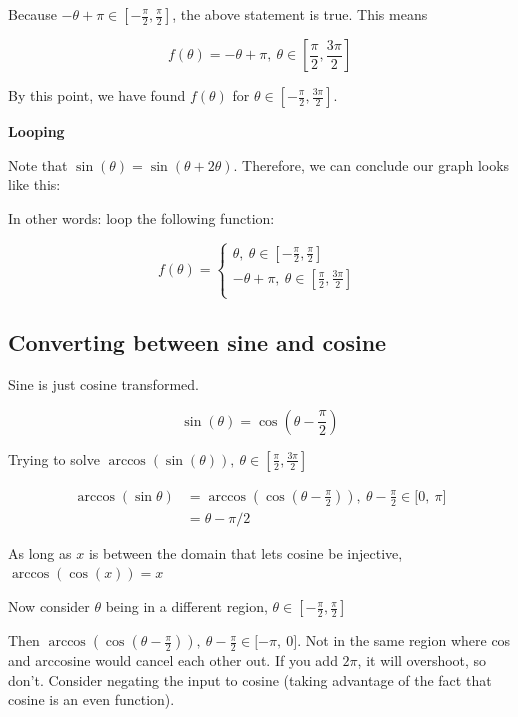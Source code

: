 \documentclass[12pt]{article}
\theoremstyle{plain}
\theoremstyle{remark}
\theoremstyle{definition}
\begin{document}
Because
\(- \theta + \pi \in \left\lbrack - \frac{\pi}{2},\frac{\pi}{2} \right\rbrack\),
the above statement is true. This means

\[f(\theta) = - \theta + \pi,\ \theta \in \left\lbrack \frac{\pi}{2},\frac{3\pi}{2} \right\rbrack\]

By this point, we have found \(f(\theta)\) for
\(\theta \in \left\lbrack - \frac{\pi}{2},\frac{3\pi}{2} \right\rbrack\).

\textbf{Looping}

Note that \(\sin(\theta) = \sin(\theta + 2\theta)\). Therefore, we can
conclude our graph looks like this:

In other words: loop the following function:

\[f(\theta) = \left\{ \begin{matrix}
\theta,\ \theta \in \left\lbrack - \frac{\pi}{2},\frac{\pi}{2} \right\rbrack \\
 - \theta + \pi,\ \theta \in \left\lbrack \frac{\pi}{2},\frac{3\pi}{2} \right\rbrack \\
\end{matrix} \right.\ \]


\subsection{Converting between sine and
cosine}

Sine is just cosine transformed.

\[\sin(\theta) = \cos\left( \theta - \frac{\pi}{2} \right)\]

Trying to solve
\(\arccos\left( \sin(\theta) \right),\ \theta \in \left\lbrack \frac{\pi}{2},\frac{3\pi}{2} \right\rbrack\)

\begin{align*}
\arccos\left( \sin\theta \right) &= \arccos\left( \cos\left( \theta - \frac{\pi}{2} \right) \right),\ \theta - \frac{\pi}{2} \in \lbrack 0,\ \pi\rbrack \\
&= \theta - \pi/2
\end{align*}


As long as \(x\) is between the domain that lets cosine be injective,
\(\arccos\left( \cos(x) \right) = x\)

Now consider \(\theta\) being in a different region,
\(\theta \in \left\lbrack - \frac{\pi}{2},\frac{\pi}{2} \right\rbrack\)

Then
\(\arccos\left( \cos\left( \theta - \frac{\pi}{2} \right) \right),\ \theta - \frac{\pi}{2} \in \lbrack - \pi,\ 0\rbrack\).
Not in the same region where cos and arccosine would cancel each other
out. If you add \(2\pi\), it will overshoot, so don't. Consider negating
the input to cosine (taking advantage of the fact that cosine is an even
function).
\end{document}
